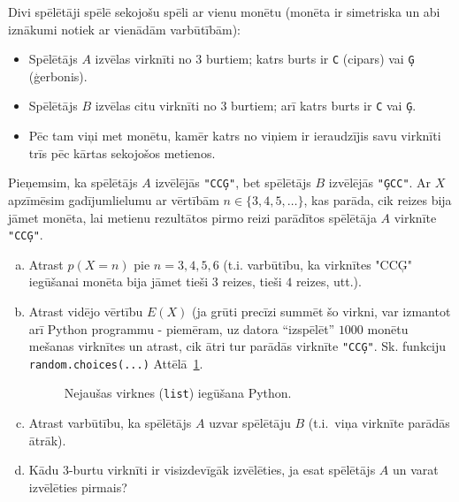 \documentclass[a4paper,12pt]{article}
\begin{document}
\vspace{10pt}
\begin{problem}
Divi spēlētāji spēlē sekojošu spēli ar vienu monētu (monēta ir simetriska un abi iznākumi notiek ar vienādām varbūtībām):
\begin{itemize}
\item Spēlētājs $A$ izvēlas virknīti no $3$ burtiem; katrs burts ir {\tt C} (cipars) vai {\tt Ģ} (ģerbonis).
\item Spēlētājs $B$ izvēlas citu virknīti no $3$ burtiem; arī katrs burts ir {\tt C} vai {\tt Ģ}.
\item Pēc tam viņi met monētu, kamēr katrs no viņiem ir ieraudzījis savu virknīti trīs pēc kārtas sekojošos metienos. 
\end{itemize}
Pieņemsim, ka spēlētājs $A$ izvēlējās {\tt "CCĢ"}, bet spēlētājs $B$ izvēlējās {\tt "ĢCC"}. 
Ar $X$ apzīmēsim gadījumlielumu ar vērtībām $n \in \{ 3,4,5,\ldots \}$, kas parāda, cik reizes bija jāmet monēta, lai metienu rezultātos
pirmo reizi parādītos spēlētāja $A$ virknīte {\tt "CCĢ"}.
\begin{enumerate}[(a)]
\item Atrast $p(X=n)$ pie $n=3,4,5,6$ (t.i. varbūtību, ka virknītes "CCĢ" iegūšanai monēta bija jāmet tieši $3$ reizes, tieši $4$ reizes, utt.). 
\item Atrast vidējo vērtību $E(X)$ (ja grūti precīzi summēt šo virkni, var izmantot arī Python programmu - piemēram, uz datora ``izspēlēt'' 
$1000$ monētu mešanas virknītes un atrast, cik ātri tur parādās virknīte {\tt "CCĢ"}. Sk. funkciju {\tt random.choices(...)} Attēlā~\ref{fig:python-choices}.
\begin{figure}[!htb]
\caption{\label{fig:python-choices} Nejaušas virknes ({\tt list}) iegūšana Python.}
\end{figure}
\item Atrast varbūtību, ka spēlētājs $A$ uzvar spēlētāju $B$ (t.i.\ viņa virknīte parādās ātrāk).
\item Kādu $3$-burtu virknīti ir visizdevīgāk izvēlēties, ja esat spēlētājs $A$ un varat izvēlēties pirmais?
\end{enumerate}
\end{problem}
\end{document}
